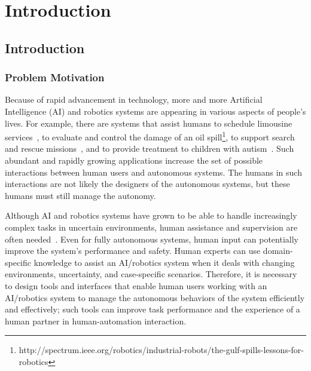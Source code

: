 \chapter{Introduction}
\label{chap:intro}

\section{Introduction}
\label{intro}

\subsection{Problem Motivation}

Because of rapid advancement in technology, more and more Artificial Intelligence (AI) and robotics systems are appearing in various aspects of people's lives. For example, there are systems that assist humans to schedule limousine services~\cite{Chun2010Limousine}, to evaluate and control the damage of an oil spill\footnote{http://spectrum.ieee.org/robotics/industrial-robots/the-gulf-spills-lessons-for-robotics}, to support search and rescue missions~\cite{Casper2003WTO, Lin2010Supporting}, and to provide treatment to children with autism~\cite{Robins2009From}. Such abundant and rapidly growing applications increase the set of possible interactions between human users and autonomous systems. The humans in such interactions are not likely the designers of the autonomous systems, but these humans must still manage the autonomy.

Although AI and robotics systems have grown to be able to handle increasingly complex tasks in uncertain environments, human assistance and supervision are often needed~\cite{Bainbridge1983Ironies}. Even for fully autonomous systems, human input can potentially improve the system's performance and safety. Human experts can use domain-specific knowledge to assist an AI/robotics system when it deals with changing environments, uncertainty, and case-specific scenarios. Therefore, it is necessary to design tools and interfaces that enable human users working with an AI/robotics system to manage the autonomous behaviors of the system efficiently and effectively; such tools can improve task performance and the experience of a human partner in human-automation interaction. 

